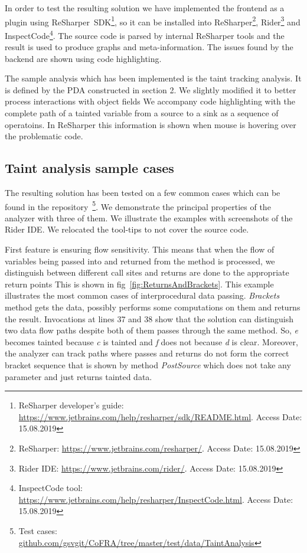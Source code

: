 In order to test the resulting solution we have implemented the frontend as a plugin using ReSharper~SDK\footnote{ReSharper developer's guide: \url{https://www.jetbrains.com/help/resharper/sdk/README.html}. Access Date: 15.08.2019}, so it can be installed into ReSharper\footnote{ReSharper: \url{https://www.jetbrains.com/resharper/}. Access Date: 15.08.2019}, Rider\footnote{Rider IDE: \url{https://www.jetbrains.com/rider/}. Access Date: 15.08.2019} and InspectCode\footnote{InspectCode tool: \url{https://www.jetbrains.com/help/resharper/InspectCode.html}. Access Date: 15.08.2019}.
The source code is parsed by internal ReSharper tools and the result is used to produce graphs and meta-information.
The issues found by the backend are shown using code highlighting.

The sample analysis which has been implemented is the taint tracking analysis.
It is defined by the PDA constructed in section 2.
We slightly modified it to better process interactions with object fields
We accompany code highlighting with the complete path of a tainted variable from a source to a sink as a sequence of operatoins.
In ReSharper this information is shown when mouse is hovering over the problematic code.

\subsection{Taint analysis sample cases}

The resulting solution has been tested on a few common cases which can be found in the repository~\footnote{Test cases: \url{github.com/gsvgit/CoFRA/tree/master/test/data/TaintAnalysis}}.
We demonstrate the principal properties of the analyzer with three of them.
We illustrate the examples with screenshots of the Rider IDE.
We relocated the tool-tips to not cover the source code. 

First feature is ensuring flow sensitivity. 
This means that when the flow of variables being passed into and returned from the method is processed, we distinguish between different call sites and returns are done to the appropriate return points
This is shown in fig~\ref{fig:ReturnsAndBrackets}.
This example illustrates the most common cases of interprocedural data passing.
\textit{Brackets} method gets the data, possibly performs some computations on them and returns the result.
Invocations at lines 37 and 38 show that the solution can distinguish two data flow paths despite both of them passes through the same method.
So, \textit{e} becomes tainted because \textit{c} is tainted and \textit{f} does not because \textit{d} is clear.
Moreover, the analyzer can track paths where passes and returns do not form the correct bracket sequence that is shown by method \textit{PostSource} which does not take any parameter and just returns tainted data.

